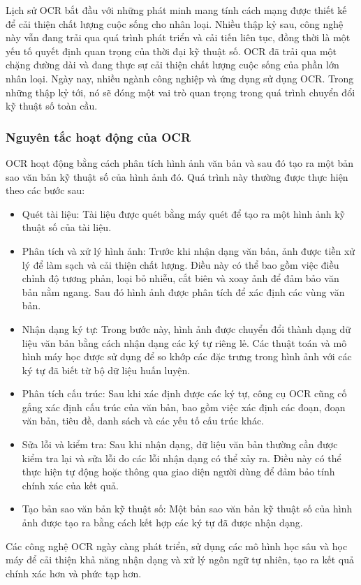 Lịch sử OCR bắt đầu với những phát minh mang tính cách mạng được thiết kế để cải thiện chất lượng cuộc sống cho nhân loại. Nhiều thập kỷ sau, công nghệ này vẫn đang trải qua quá trình phát triển và cải tiến liên tục, đồng thời là một yếu tố quyết định quan trọng của thời đại kỹ thuật số. OCR đã trải qua một chặng đường dài và đang thực sự cải thiện chất lượng cuộc sống của phần lớn nhân loại. Ngày nay, nhiều ngành công nghiệp và ứng dụng sử dụng OCR. Trong những thập kỷ tới, nó sẽ đóng một vai trò quan trọng trong quá trình chuyển đổi kỹ thuật số toàn cầu.\cite{veryfi}

\subsubsection{Nguyên tắc hoạt động của OCR}
OCR hoạt động bằng cách phân tích hình ảnh văn bản và sau đó tạo ra một bản sao văn bản kỹ thuật số của hình ảnh đó. Quá trình này thường được thực hiện theo các bước sau:
\begin{itemize}
    \item Quét tài liệu: Tài liệu được quét bằng máy quét để tạo ra một hình ảnh kỹ thuật số của tài liệu.
    \item Phân tích và xử lý hình ảnh: Trước khi nhận dạng văn bản, ảnh được tiền xử lý để làm sạch và cải thiện chất lượng. Điều này có thể bao gồm việc điều chỉnh độ tương phản, loại bỏ nhiễu, cắt biên và xoay ảnh để đảm bảo văn bản nằm ngang. Sau đó hình ảnh được phân tích để xác định các vùng văn bản.
    \item Nhận dạng ký tự: Trong bước này, hình ảnh được chuyển đổi thành dạng dữ liệu văn bản bằng cách nhận dạng các ký tự riêng lẻ. Các thuật toán và mô hình máy học được sử dụng để so khớp các đặc trưng trong hình ảnh với các ký tự đã biết từ bộ dữ liệu huấn luyện.
    \item Phân tích cấu trúc: Sau khi xác định được các ký tự, công cụ OCR cũng cố gắng xác định cấu trúc của văn bản, bao gồm việc xác định các đoạn, đoạn văn bản, tiêu đề, danh sách và các yếu tố cấu trúc khác.
    \item Sửa lỗi và kiểm tra: Sau khi nhận dạng, dữ liệu văn bản thường cần được kiểm tra lại và sửa lỗi do các lỗi nhận dạng có thể xảy ra. Điều này có thể thực hiện tự động hoặc thông qua giao diện người dùng để đảm bảo tính chính xác của kết quả.
    \item Tạo bản sao văn bản kỹ thuật số: Một bản sao văn bản kỹ thuật số của hình ảnh được tạo ra bằng cách kết hợp các ký tự đã được nhận dạng.
\end{itemize}
Các công nghệ OCR ngày càng phát triển, sử dụng các mô hình học sâu và học máy để cải thiện khả năng nhận dạng và xử lý ngôn ngữ tự nhiên, tạo ra kết quả chính xác hơn và phức tạp hơn.
